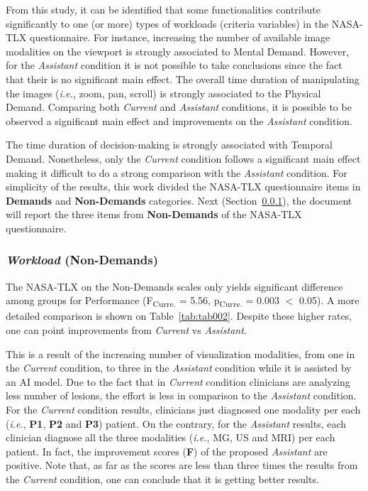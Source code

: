 From this study, it can be identified that some functionalities contribute significantly to one (or more) types of workloads (criteria variables) in the \ac{NASA-TLX} questionnaire.
For instance, increasing the number of available image modalities on the viewport is strongly associated to Mental Demand.
However, for the {\it Assistant} condition it is not possible to take conclusions since the fact that their is no significant main effect.
The overall time duration of manipulating the images ({\it i.e.}, zoom, pan, scroll) is strongly associated to the Physical Demand.
Comparing both {\it Current} and {\it Assistant} conditions, it is possible to be observed a significant main effect and improvements on the {\it Assistant} condition.

The time duration of decision-making is strongly associated with Temporal Demand.
Nonetheless, only the {\it Current} condition follows a significant main effect making it difficult to do a strong comparison with the {\it Assistant} condition.
For simplicity of the results, this work divided the \ac{NASA-TLX} questionnaire items in {\bf Demands} and {\bf Non-Demands} categories.
Next (Section~\ref{sec:chap005006001004}), the document will report the three items from {\bf Non-Demands} of the \ac{NASA-TLX} questionnaire.

\subsubsection{{\it Workload} (Non-Demands)}
\label{sec:chap005006001004}

The \ac{NASA-TLX} on the Non-Demands scales only yields significant difference among groups for Performance (F\textsubscript{Curre.} = 5.56, p\textsubscript{Curre.} = 0.003 $<$ 0.05).
A more detailed comparison is shown on Table~\ref{tab:tab002}.
Despite these higher rates, one can point improvements from {\it Current} vs {\it Assistant}.



This is a result of the increasing number of visualization modalities, from one in the {\it Current} condition, to three in the {\it Assistant} condition while it is assisted by an \ac{AI} model.
Due to the fact that in {\it Current} condition clinicians are analyzing less number of lesions, the effort is less in comparison to the {\it Assistant} condition.
For the {\it Current} condition results, clinicians just diagnosed one modality per each ({\it i.e.}, {\bf P1}, {\bf P2} and {\bf P3}) patient.
On the contrary, for the {\it Assistant} results, each clinician diagnose all the three modalities ({\it i.e.}, \ac{MG}, \ac{US} and \ac{MRI}) per each patient.
In fact, the improvement scores (\textbf{F}) of the proposed {\it Assistant} are positive.
Note that, as far as the scores are less than three times the results from the {\it Current} condition, one can conclude that it is getting better results.

